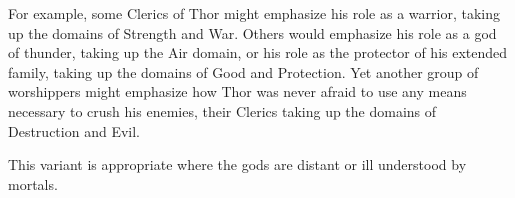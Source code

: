 For example, some Clerics of Thor might emphasize his role as a warrior, taking up the domains of Strength and War.
Others would emphasize his role as a god of thunder, taking up the Air domain, or his role as the protector of his extended family, taking up the domains of Good and Protection. 
Yet another group of worshippers might emphasize how Thor was never afraid to use any means necessary to crush his enemies,
their Clerics taking up the domains of Destruction and Evil.

This variant is appropriate where the gods are distant or ill understood by mortals.